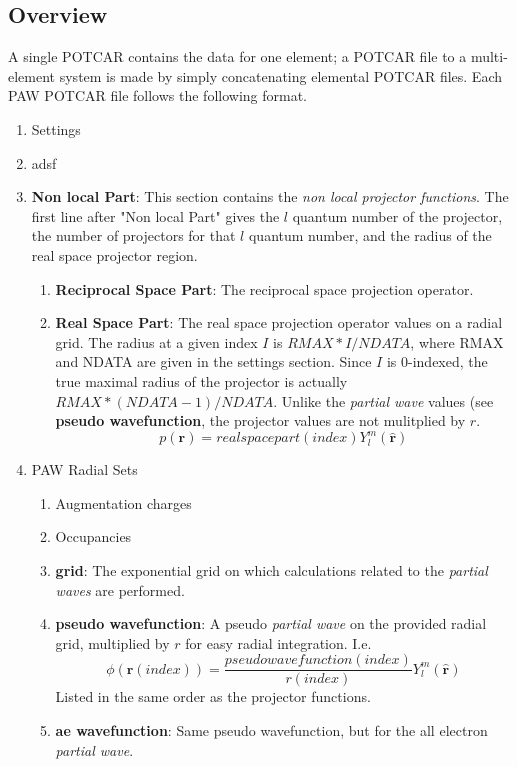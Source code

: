 \documentclass[12pt]{article}
\begin{document}
\subsection*{Overview}
A single POTCAR contains the data for one element; a POTCAR file to a multi-element system
is made by simply concatenating elemental POTCAR files. Each PAW POTCAR file follows
the following format.

\begin{enumerate}
	\item
	Settings
	\item
	adsf
	\item
	\textbf{Non local Part}: This section contains the \emph{non local projector functions}.
	The first line after "Non local Part" gives the $l$ quantum number of the projector,
	the number of projectors for that $l$ quantum number, and the radius of the real
	space projector region.
	\begin{enumerate}
		\item
		\textbf{Reciprocal Space Part}: The reciprocal space projection operator.
		\item
		\textbf{Real Space Part}: The real space projection operator values on a radial
		grid. The radius at a given index $I$ is $RMAX*I/NDATA$, where RMAX and NDATA
		are given in the settings section. Since $I$ is 0-indexed, the true maximal
		radius of the projector is actually $RMAX*(NDATA-1)/NDATA$. Unlike the
		\emph{partial wave} values (see \textbf{pseudo wavefunction},
		the projector values are not mulitplied by $r$.
		$$p(\mathbf{r})=realspacepart(index)Y_l^m(\hat{\mathbf{r}})$$
	\end{enumerate}
	\item
	PAW Radial Sets
	\begin{enumerate}
		\item
		Augmentation charges
		\item
		Occupancies
		\item
		\textbf{grid}: The exponential grid on which calculations related
		to the \emph{partial waves} are performed.
		\item
		\textbf{pseudo wavefunction}: A pseudo \emph{partial wave} on the provided
		radial grid, multiplied by $r$ for easy radial integration. I.e.
		$$\phi(\mathbf{r}(index))=\frac{pseudowavefunction(index)}{r(index)}Y_l^m(\hat{\mathbf{r}})$$
		Listed in the same order as the projector functions.
		\item
		\textbf{ae wavefunction}: Same pseudo wavefunction, but for the all electron \emph{partial wave}.
	\end{enumerate}
\end{enumerate}

\subsection*{}

\printbibliography
\end{document}
